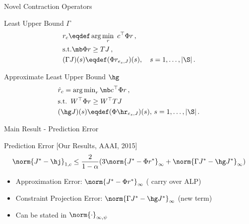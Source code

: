\documentclass[handout,10pt]{beamer}
\begin{document}
\begin{frame}[fragile]{Novel Contraction Operators}
\begin{block}{Least Upper Bound $\Gamma$}
\begin{align*}
\begin{split}
&r_c\eqdef\arg\min_{r} \,\, c^\top \Phi r\,,\\
&\text{s.t.} \mb \Phi r\geq  TJ\,,\\
&(\Gamma J)(s)\eqdef(\Phi r_{e_s,J})(s),\quad s=1,\ldots,|\S|\,.
\end{split}
\end{align*}
\end{block}

\begin{block}{Approximate Least Upper Bound $\hg$}
\begin{align*}
&\hat{r}_c={\arg\min}_r \,\mb c^\top \Phi r\,,\\
&\text{s.t.} \,\,\, W^\top  \Phi r\geq W^\top TJ\,\\
&(\hg J)(s)\eqdef(\Phi \hr_{e_s,J})(s),\, s=1,\ldots,|\S|\,.
\end{align*}
\end{block}
\end{frame}



\begin{frame}[fragile]{Main Result - Prediction Error}

\begin{block}{Prediction Error [Our Results, AAAI, 2015]}
\begin{align*}
\norm{J^*-\hj}_{1,c}\leq \frac{2}{1-\alpha}( 3\norm{J^*-\Phi r^*}_{\infty}+ \norm{\Gamma J^*-\hg J^*}_{\infty})
\end{align*}
\end{block}

\begin{itemize}
\item Approximation Error: $\norm{J^*-\Phi r^*}_{\infty}$ ( carry over ALP)
\item Constraint Projection Error: $\norm{\Gamma J^*-\hg J^*}_{\infty}$ (new term)
\item Can be stated in $\norm{\cdot}_{\infty,\psi}$
\end{itemize}
\end{frame}
\end{document}
